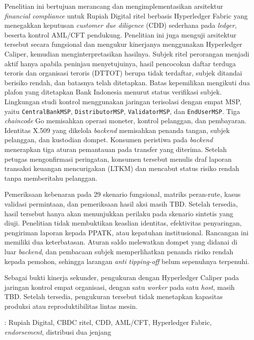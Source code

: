 Penelitian ini bertujuan merancang dan mengimplementasikan arsitektur \textit{financial compliance} untuk Rupiah Digital ritel berbasis Hyperledger Fabric yang menegakkan keputusan \textit{customer due diligence} (CDD) sederhana pada \textit{ledger}, beserta kontrol AML/CFT pendukung. Penelitian ini juga menguji arsitektur tersebut secara fungsional dan mengukur kinerjanya menggunakan Hyperledger Caliper, kemudian menginterpretasikan hasilnya. Subjek ritel perorangan menjadi aktif hanya apabila peninjau menyetujuinya, hasil pencocokan daftar terduga teroris dan organisasi teroris (DTTOT) berupa tidak terdaftar, subjek ditandai berisiko rendah, dan batasnya telah ditetapkan. Batas kepemilikan mengikuti dua plafon yang ditetapkan Bank Indonesia menurut status verifikasi subjek. Lingkungan
studi kontrol menggunakan jaringan terisolasi dengan empat MSP, yaitu
\texttt{CentralBankMSP}, \texttt{DistributorMSP}, \texttt{ValidatorMSP}, dan
\texttt{EndUserMSP}. Tiga \textit{chaincode} Go memisahkan operasi moneter,
kontrol pelanggan, dan pembayaran. Identitas X.509 yang dikelola \textit{backend}
memisahkan penanda tangan, subjek pelanggan, dan kustodian dompet. Konsumen peristiwa pada \textit{backend} menerapkan tiga aturan pemantauan pada transfer yang diterima. Setelah petugas mengonfirmasi peringatan, konsumen tersebut menulis draf laporan transaksi keuangan mencurigakan (LTKM) dan mencabut status risiko rendah tanpa memberitahu pelanggan.

Pemeriksaan kebenaran pada 29 skenario fungsional, matriks peran-rute, kasus validasi permintaan, dan pemeriksaan hasil aksi masih TBD. Setelah tersedia, hasil tersebut hanya akan menunjukkan perilaku pada skenario sintetis yang diuji. Penelitian tidak membuktikan keaslian identitas, efektivitas penyaringan, pengiriman laporan kepada PPATK, atau kepatuhan institusional. Rancangan ini memiliki dua keterbatasan. Aturan saldo melewatkan dompet yang didanai di luar \textit{backend}, dan pembacaan subjek memperlihatkan penanda risiko rendah kepada pemohon, sehingga larangan \textit{anti tipping-off} belum sepenuhnya terpenuhi.

Sebagai bukti kinerja sekunder, pengukuran dengan Hyperledger Caliper pada jaringan kontrol empat organisasi, dengan satu \textit{worker} pada satu \textit{host}, masih TBD. Setelah tersedia, pengukuran tersebut tidak menetapkan kapasitas produksi atau reproduktibilitas lintas mesin.

\vspace{0.5cm}

: Rupiah Digital, CBDC ritel, CDD, AML/CFT,
Hyperledger Fabric, \textit{endorsement}, distribusi dua jenjang
